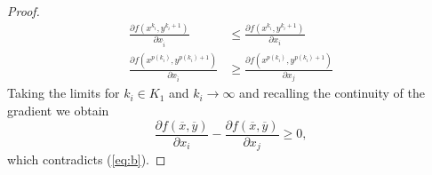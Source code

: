 \begin{proof}
\begin{equation}
\begin{aligned}
 \frac{\partial f(x^{k_i},y^{k_i+1})}{\partial x_{\hat i}} &\le \frac{\partial f(x^{k_i},y^{k_i+1})}{\partial x_{i}}\\
 \frac{\partial f(x^{p(k_i)},y^{p(k_i)+1})}{\partial x_{\hat i}} &\ge \frac{\partial f(x^{p(k_i)},y^{p(k_i)+1})}{\partial x_{j}}
 \end{aligned}
\end{equation}
Taking the limits for $k_i\in K_1$ and $k_i\to\infty$ and recalling the continuity of the gradient we obtain
$$
 \frac{\partial f(\overline{x},\overline{y})}{\partial x_i} - \frac{\partial f(\overline{x},\overline{y})}{\partial x_{j}} \ge 0,
$$
which contradicts (\ref{eq:b}).
\end{proof}